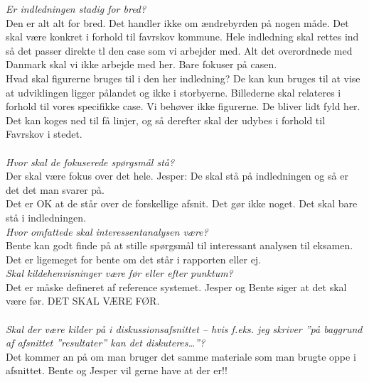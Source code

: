 \textit{Er indledningen stadig for bred?}\\
Den er alt alt for bred. Det handler ikke om ændrebyrden på nogen måde. Det skal være konkret i forhold til favrskov kommune. Hele indledning skal rettes ind så det passer direkte tl den case som vi arbejder med. Alt det overordnede med Danmark skal vi ikke arbejde med her. Bare fokuser på casen. \\
Hvad skal figurerne bruges til i den her indledning? De kan kun bruges til at vise at udviklingen ligger pålandet og ikke i storbyerne. Billederne skal relateres i forhold til vores specifikke case. Vi behøver ikke figurerne. De bliver lidt fyld her. \\ 
Det kan koges ned til få linjer, og så derefter skal der udybes i forhold til Favrskov i stedet.\\ 
\\
\textit{Hvor skal de fokuserede spørgsmål stå? }\\
Der skal være fokus over det hele. Jesper: De skal stå på indledningen og så er det det man svarer på.\\
Det er OK at de står over de forskellige afsnit. Det gør ikke noget. Det skal bare stå i indledningen.\\
\textit{Hvor omfattede skal interessentanalysen være?}\\
Bente kan godt finde på at stille spørgsmål til interessant analysen til eksamen. Det er ligemeget for bente om det står i rapporten eller ej.\\
\textit{Skal kildehenvisninger være før eller efter punktum?}\\
Det er måske defineret af reference systemet. Jesper og Bente siger at det skal være før. DET SKAL VÆRE FØR.\\ 
\\
\textit{Skal der være kilder på i diskussionsafsnittet – hvis f.eks. jeg skriver ”på baggrund af afsnittet ”resultater” kan det diskuteres…”?}\\
Det kommer an på om man bruger det samme materiale som man brugte oppe i afsnittet. Bente og Jesper vil gerne have at der er!!\\

